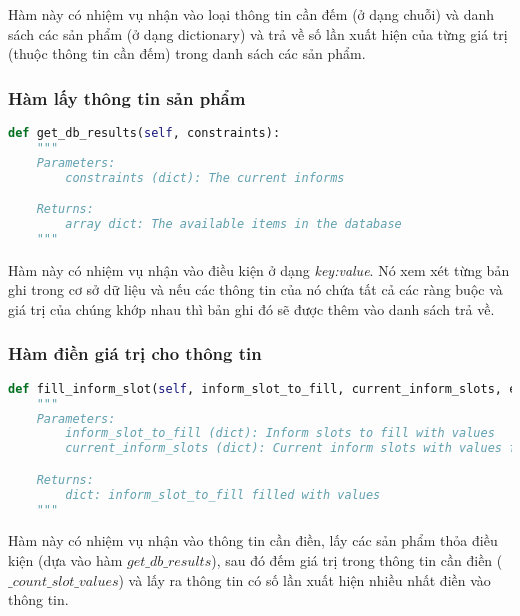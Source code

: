 Hàm này có nhiệm vụ nhận vào loại thông tin cần đếm (ở dạng chuỗi) và danh sách các sản phẩm (ở dạng dictionary) và trả về số lần xuất hiện của từng giá trị (thuộc thông tin cần đếm) trong danh sách các sản phẩm.

\subsubsection{Hàm lấy thông tin sản phẩm}

\renewcommand{\lstlistingname}{Hàm}
\begin{lstlisting}[caption={Hàm lấy thông tin sản phẩm},language=python,firstnumber=1]
def get_db_results(self, constraints):
    """
    Parameters:
        constraints (dict): The current informs

    Returns:
        array dict: The available items in the database
    """
\end{lstlisting}

Hàm này có nhiệm vụ nhận vào điều kiện ở dạng \textit{key:value}. Nó xem xét từng bản ghi trong cơ sở dữ liệu và nếu các thông tin của nó chứa tất cả các ràng buộc và giá trị của chúng khớp nhau thì bản ghi đó sẽ được thêm vào danh sách trả về.

\subsubsection{Hàm điền giá trị cho thông tin}

\renewcommand{\lstlistingname}{Hàm}
\begin{lstlisting}[caption={Hàm điền giá trị cho thông tin},language=python,firstnumber=1]
def fill_inform_slot(self, inform_slot_to_fill, current_inform_slots, entity_list):
    """
    Parameters:
        inform_slot_to_fill (dict): Inform slots to fill with values
        current_inform_slots (dict): Current inform slots with values from the StateTracker

    Returns:
        dict: inform_slot_to_fill filled with values
    """
\end{lstlisting}

Hàm này có nhiệm vụ nhận vào thông tin cần điền, lấy các sản phẩm thỏa điều kiện (dựa vào hàm $get\_db\_results$), sau đó đếm giá trị trong thông tin cần điền ($\_count\_slot\_values$) và lấy ra thông tin có số lần xuất hiện nhiều nhất điền vào thông tin.

